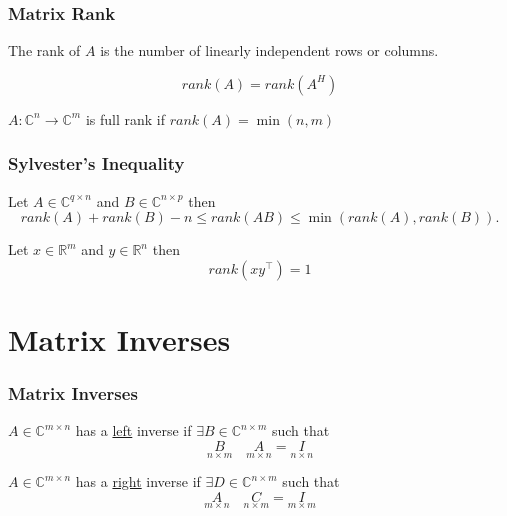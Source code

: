 \documentclass{beamer}
\begin{document}
\begin{frame}\frametitle{Matrix Rank}
	\begin{definition}
		The rank of $A$ is the number of linearly independent rows or columns.
	\end{definition}
	
	\begin{lemma}
		\[ rank(A) = rank(A^H) \]
	\end{lemma}

	\begin{definition}
		$A: \mathbb{C}^n\to \mathbb{C}^m $ is full rank if $rank(A) = \min(n,m)$
	\end{definition}
	
\end{frame}

\begin{frame}\frametitle{Sylvester's Inequality}
	\begin{lemma}
		Let $A \in \mathbb{C}^{q\times n}$ and $B \in \mathbb{C}^{n \times p}$ then 
		\[
			rank(A) + rank(B) - n \leq rank(AB) \leq \min(rank(A),rank(B)).
		\]
	\end{lemma}
	
	\vfill

	\begin{example}
	Let $x \in \mathbb{R}^m$ and $y \in \mathbb{R}^n$ then
	\[ rank(xy^\top) = 1 \]
	
	\end{example}
\end{frame}

\section{Matrix Inverses}
\frame{\sectionpage}

\begin{frame}\frametitle{Matrix Inverses}
	\begin{definition}
		$A \in \mathbb{C}^{m\times n}$ has a \underline{left} inverse if $\exists B \in \mathbb{C}^{n \times m}$ such that
		\[ \underset{n \times m}{B} \quad \underset{m \times n}{A} = \underset{n \times n}{I}\]
	\end{definition}
	\begin{definition}
		$A \in \mathbb{C}^{m \times n}$ has a \underline{right} inverse if $\exists D \in \mathbb{C}^{n \times m}$ such that 
		\[ \underset{m \times n}{A} \quad \underset{n \times m}{C} = \underset{m \times m}{I} \]
	\end{definition}
\end{frame}
\end{document}
